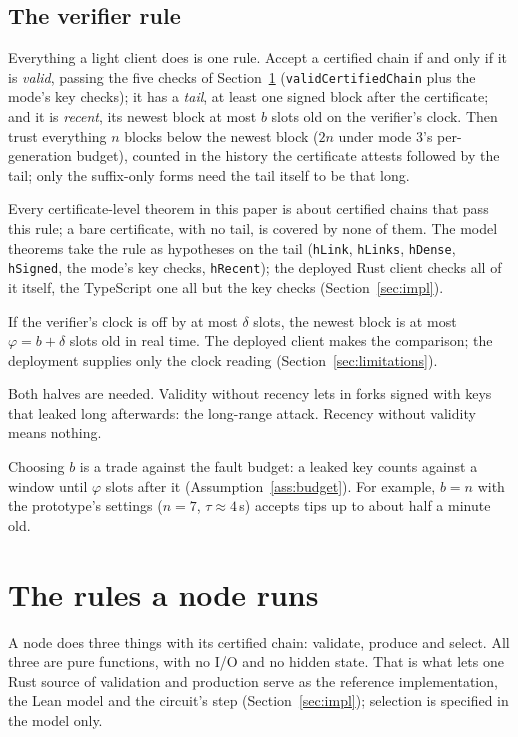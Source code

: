 \documentclass[10pt]{article}
\DeclareRobustCommand{\code}[1]{{\renewcommand{\_}{\textunderscore\allowbreak}\texttt{#1}}}
\begin{document}
\subsection{The verifier rule}
\label{sec:verifier-rule}

Everything a light client does is one rule. Accept a certified chain if
and only if it is \emph{valid}, passing the five checks of
Section~\ref{sec:rules} (\code{validCertifiedChain} plus the mode's key
checks); it has a \emph{tail}, at least one signed block after the
certificate; and it is \emph{recent}, its newest block at most $b$ slots
old on the verifier's clock. Then trust everything $n$ blocks below the
newest block ($2n$ under mode 3's per-generation budget), counted in the
history the certificate attests followed by the tail; only the
suffix-only forms need the tail itself to be that long.

Every certificate-level theorem in this paper is about certified chains
that pass this rule; a bare certificate, with no tail, is covered by none
of them. The model theorems take the rule as hypotheses on the tail
(\code{hLink}, \code{hLinks}, \code{hDense}, \code{hSigned}, the mode's
key checks, \code{hRecent}); the deployed Rust client checks all of it itself, the
TypeScript one all but the key checks (Section~\ref{sec:impl}).

If the verifier's clock is off by at most $\delta$ slots, the newest block
is at most $\varphi = b + \delta$ slots old in real time. The deployed
client makes the comparison; the deployment supplies only the clock
reading (Section~\ref{sec:limitations}).

Both halves are needed. Validity without recency lets in forks signed
with keys that leaked long afterwards: the long-range attack. Recency
without validity means nothing.

Choosing $b$ is a trade against the fault budget: a leaked key counts
against a window until $\varphi$ slots after it
(Assumption~\ref{ass:budget}). For example, $b = n$ with the prototype's
settings ($n = 7$, $\tau \approx 4$\,s) accepts tips up to about half a
minute old.

\section{The rules a node runs}
\label{sec:rules}

A node does three things with its certified chain: validate, produce and
select. All three are pure functions, with no I/O and no hidden state.
That is what lets one Rust source of validation and production serve as
the reference implementation, the Lean model and the circuit's step
(Section~\ref{sec:impl}); selection is specified in the model only.
\end{document}
